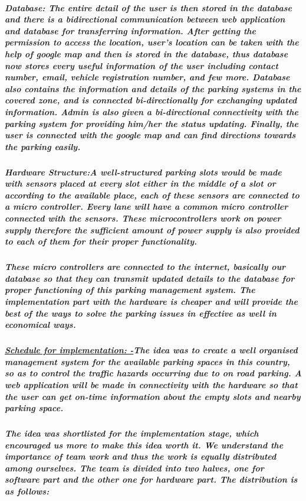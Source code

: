 \documentclass[]{article}
\begin{document}
\subparagraph{\textbf{Database:\newline} 
The entire detail of the user is then stored in the database and there is a bidirectional communication between web application and database for transferring information. After getting the permission to access the location, user’s location can be taken with the help of google map and then is stored in the database, thus database now stores every useful information of the user including contact number, email, vehicle registration number, and few more. Database also contains the information and details of the parking systems in the covered zone, and is connected bi-directionally for exchanging updated information.
Admin is also given a bi-directional connectivity with the parking system for providing him/her the status updating.
Finally, the user is connected with the google map and can find directions towards the parking easily.
}
\subparagraph{\textbf{Hardware Structure:\newline}A well-structured parking slots would be made with sensors placed at every slot either in the middle of a slot or according to the available place, each of these sensors are connected to a micro controller. Every lane will have a common micro controller connected with the sensors. These microcontrollers work on power supply therefore the sufficient amount of power supply is also provided to each of them for their proper functionality.}
\subparagraph{
These micro controllers are connected to the internet, basically our database so that they can transmit updated details to the database for proper functioning of this parking management system.
The implementation part with the hardware is cheaper and will provide the best of the ways to solve the parking issues in effective as well in economical ways.
}
\subparagraph{\textbf{\underline{Schedule for implementation: -}}\newline The idea was to create a well organised management system for the available parking spaces in this country, so as to control the traffic hazards occurring due to on road parking. A web application will be made in connectivity with the hardware so that the user can get on-time information about the empty slots and nearby parking space.}
\subparagraph{
The idea was shortlisted for the implementation stage, which encouraged us more to make this idea worth it. We understand the importance of team work and thus the work is equally distributed among ourselves. The team is divided into two halves, one for software part and the other one for hardware part. The distribution is as follows:
}
\end{document}
